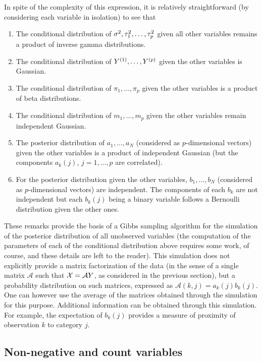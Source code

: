 In spite of the complexity of this expression, it is relatively straightforward (by considering each variable in isolation) to see that 
\begin{enumerate}[label=$\bullet$, wide=0.5cm]
\item The conditional distribution of $\sigma^2, \tau_1^2, \ldots, \tau_p^2$ given all other variables remains a product of inverse gamma distributions. 
\item The conditional distribution of $Y^{(1)}, \ldots, Y^{(p)}$ given the other variables is Gaussian. 
\item The conditional distribution of $\pi_1, \ldots, \pi_p$ given the other variables is a product of beta distributions. 
\item The conditional distribution of $m_1, \ldots, m_p$ given the other variables remain independent Gaussian.
\item The posterior distribution of $a_1, \ldots, a_N$ (considered as $p$-dimensional vectors) given the other variables is a product of independent Gaussian (but the components $a_k(j)$, $j=1, \ldots, p$ are correlated). 
\item For the posterior distribution  given the other variables, $b_1, \ldots, b_N$ (considered as $p$-dimensional vectors) are independent. The components of each $b_k$ are not independent but each $b_k(j)$ being a binary variable follows a Bernoulli distribution given the other ones. 
\end{enumerate}
These remarks provide the basis of a Gibbs sampling algorithm for the simulation of the posterior distribution of all unobserved variables (the computation of the parameters of each of the conditional distribution above requires some work, of course, and these details are left to the reader). This simulation does not explicitly provide a matrix factorization of the data (in the sense of a single matrix $\mathcal A$ such that ${\mathcal X}=\mathcal AY$, as considered in the previous section), but a probability distribution on such matrices, expressed as $\mathcal A(k,j) = a_k(j) b_k(j)$. One can however use the average of the matrices obtained through the simulation for this purpose. Additional information can be obtained through this simulation. For example, the expectation of $b_k(j)$ provides a measure of proximity of observation $k$ to category $j$. 


\subsection{Non-negative and count variables}
\label{sec:b.count}

